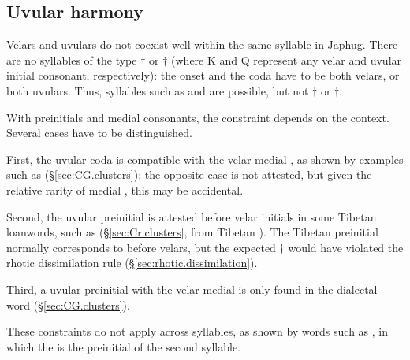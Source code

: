 \subsection{Uvular harmony} \label{sec:uvular.harmony}
Velars and uvulars do not coexist well within the same syllable in Japhug. There are no syllables of the type $\dagger$ or $\dagger$ (where K and Q  represent any velar and uvular initial consonant, respectively): the onset and the coda have to be both velars, or both uvulars. Thus, syllables such as  and  are possible, but not $\dagger$ or $\dagger$. 

With preinitials and medial consonants, the constraint depends on the context. Several cases have to be distinguished.

First, the uvular coda  is compatible with the velar medial , as shown by examples such as  (§\ref{sec:CG.clusters}); the opposite case is not attested, but given the relative rarity of medial , this may be accidental.

Second, the uvular preinitial   is attested before velar initials in some Tibetan loanwords, such as  (§\ref{sec:Cr.clusters}, from Tibetan ). The Tibetan preinitial  normally corresponds to  before velars, but the expected $\dagger$ would have violated the rhotic dissimilation rule (§\ref{sec:rhotic.dissimilation}).

Third, a uvular preinitial with the velar medial  is only found in the dialectal word  (§\ref{sec:CG.clusters}).

These constraints do not apply across syllables, as shown by words such as , in which the  is the preinitial of the second syllable.

